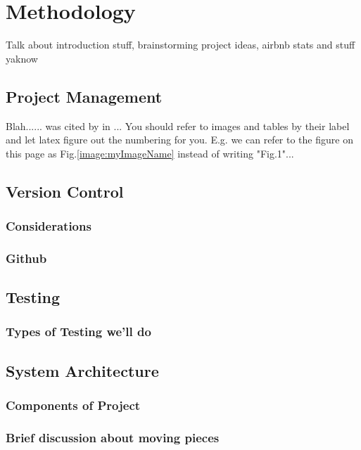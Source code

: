 \chapter{Methodology}
Talk about introduction stuff, brainstorming project ideas, airbnb stats and stuff yaknow 

\section{Project Management}
Blah...... was cited by \cite{zasloff2002antimicrobial} in ... You should refer to images and tables by their label and let latex figure out the numbering for you. E.g. we can refer to the figure on this page as Fig.\ref{image:myImageName} instead of writing "Fig.1"...

\section{Version Control}
\subsection{Considerations}
\subsection{Github}




\section{Testing}
\subsection{Types of Testing we'll do}

\section{System Architecture}
\subsection{Components of Project}
\subsection{Brief discussion about moving pieces}



